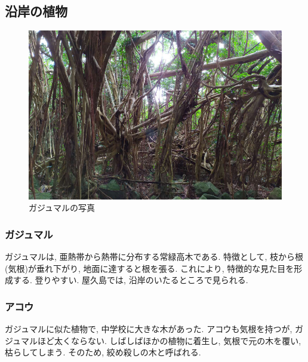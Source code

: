 \documentclass[10pt,titlepage,a5paper]{ltjsbook}
\begin{document}
  \subsection{沿岸の植物}
    \begin{minipage}{0.38\columnwidth}
      \begin{figure}[H]
            \centering
            \includegraphics[width=\columnwidth]{gajumaru.jpg}
            \caption{ガジュマルの写真}
            \label{fig:gajumaru_photo}
        \end{figure}
    \end{minipage}
    \hfill
    \begin{minipage}{0.58\columnwidth}
      \subsubsection*{ガジュマル}
      ガジュマルは, 亜熱帯から熱帯に分布する常緑高木である. 特徴として, 枝から根(気根)が垂れ下がり, 地面に達すると根を張る. これにより, 特徴的な見た目を形成する. 登りやすい. 屋久島では, 沿岸のいたるところで見られる.
    \end{minipage}
    \begin{minipage}{0.58\columnwidth}
      \subsubsection*{アコウ}
        ガジュマルに似た植物で, 中学校に大きな木があった. アコウも気根を持つが, ガジュマルほど太くならない. しばしばほかの植物に着生し, 気根で元の木を覆い, 枯らしてしまう. そのため, 絞め殺しの木\footnotemark[8]と呼ばれる.
    \end{minipage}
\end{document}
